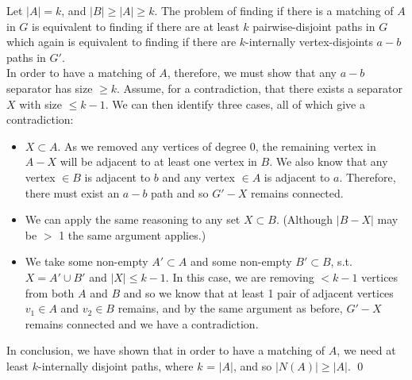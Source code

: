 \linebreak 
Let $|A| = k$, and $|B| \geq |A| \geq k$. The problem of finding if there is a matching of $A$ in $G$ is equivalent to finding if there are at least $k$ pairwise-disjoint paths in $G$ which again is equivalent to finding if there are $k$-internally vertex-disjoints $a-b$ paths in $G'$. \\
\linebreak 
In order to have a matching of $A$, therefore, we must show that any $a-b$ separator has size $\geq k$. Assume, for a contradiction, that there exists a separator $X$ with size $\leq k-1$. We can then identify three cases, all of which give a contradiction: 
\begin{itemize}
    \item $X \subset A$. As we removed any vertices of degree 0, the remaining vertex in $A-X$ will be adjacent to at least one vertex in $B$. We also know that any vertex $\in B$ is adjacent to $b$ and any vertex $\in A$ is adjacent to $a$. Therefore, there must exist an $a-b$ path and so $G'-X$ remains connected. 
    \item We can apply the same reasoning to any set $X \subset B$. (Although $|B-X|$ may be $>$ 1 the same argument applies.)
    \item We take some non-empty $A' \subset A$ and some non-empty $B' \subset B$, s.t. $X = A' \cup B'$ and $|X| \leq k-1$. In this case, we are removing $< k-1$ vertices from both $A$ and $B$ and so we know that at least 1 pair of adjacent vertices $v_1 \in A$ and $v_2 \in B$ remains, and by the same argument as before, $G'-X$ remains connected and we have a contradiction.   
\end{itemize}
In conclusion, we have shown that in order to have a matching of $A$, we need at least $k$-internally disjoint paths, where $k$ = $|A|$, and so $|N(A)| \geq |A|$. \qed